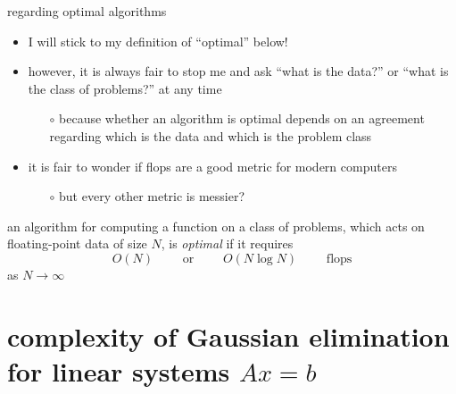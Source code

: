 \documentclass[10pt,
               svgnames,
               hyperref={colorlinks,citecolor=DeepPink4,linkcolor=FireBrick,urlcolor=Maroon},
               usepdftitle=false]{beamer}
\newcommand{\optimaldef}{
\begin{definition}
an algorithm for computing a function on a class of problems, which acts on floating-point data of size $N$, is \emph{optimal} if it requires
   $$O(N) \qquad \text{ or } \qquad O(N\log N) \qquad \text{ flops}$$
as $N\to\infty$
\end{definition}
}
\begin{document}
\begin{frame}{regarding optimal algorithms}

\begin{itemize}
\item I will stick to my definition of ``optimal'' below!
\item however, it is \alert{always} fair to stop me and ask ``what is the data?'' or ``what is the class of problems?'' at any time
    \begin{itemize}
    \item[$\circ$] because whether an algorithm is optimal depends on an agreement regarding which is the data and which is the problem class
    \end{itemize}
\item<2-> it is fair to wonder if flops are a good metric for modern computers
    \begin{itemize}
    \item[$\circ$] but every other metric is messier?
    \end{itemize}
\end{itemize}

\optimaldef
\end{frame}



\section{complexity of Gaussian elimination for linear systems $Ax=b$}
\end{document}
